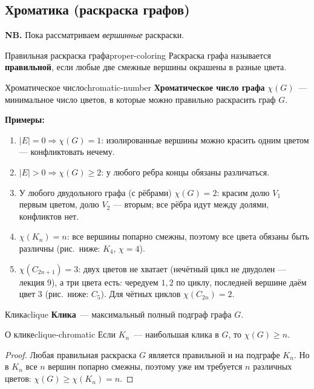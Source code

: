 
\subsection*{Хроматика (раскраска графов)}

\textbf{NB.} Пока рассматриваем \emph{вершинные} раскраски.

\begin{defn}{Правильная раскраска графа}{proper-coloring}
Раскраска графа называется \textbf{правильной}, если любые две смежные вершины окрашены в разные цвета.
\end{defn}

\begin{defn}{Хроматическое число}{chromatic-number}
\textbf{Хроматическое число графа} $\chi(G)$~--- минимальное число цветов, в которые можно правильно раскрасить граф $G$.
\end{defn}

\textbf{Примеры:}
\begin{enumerate}
  \item $|E| = 0 \Rightarrow \chi(G) = 1$: изолированные вершины можно
        красить одним цветом --- конфликтовать нечему.
  \item $|E| > 0 \Rightarrow \chi(G) \geq 2$: у любого ребра концы
        обязаны различаться.
  \item У любого двудольного графа (с рёбрами) $\chi(G) = 2$: красим
        долю $V_1$ первым цветом, долю $V_2$ --- вторым; все рёбра идут
        между долями, конфликтов нет.
  \item $\chi(K_n) = n$: все вершины попарно смежны, поэтому все цвета
        обязаны быть различны (рис.~ниже: $K_4$, $\chi = 4$).
  \item $\chi(C_{2n+1}) = 3$: двух цветов не хватает (нечётный цикл не
        двудолен --- лекция 9), а три цвета есть: чередуем $1, 2$ по
        циклу, последней вершине даём цвет $3$ (рис.~ниже: $C_5$).
        Для чётных циклов $\chi(C_{2n}) = 2$.
\end{enumerate}


\begin{defn}{Клика}{clique}
\textbf{Клика}~--- максимальный полный подграф графа $G$.
\end{defn}

\begin{lemma}{О клике}{clique-chromatic}
Если $K_n$~--- наибольшая клика в $G$, то $\chi(G) \geq n$.
\end{lemma}

\begin{proof}
Любая правильная раскраска $G$ является правильной и на подграфе $K_n$.
Но в $K_n$ все $n$ вершин попарно смежны, поэтому уже им требуется $n$
различных цветов: $\chi(G) \ge \chi(K_n) = n$.
\end{proof}
